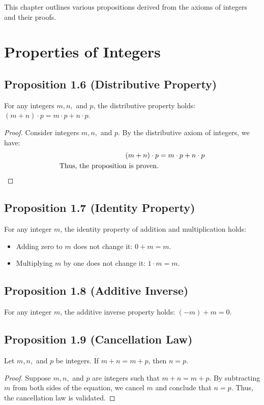 This chapter outlines various propositions derived from the axioms of integers and their proofs.

\section*{Properties of Integers}

\subsection*{Proposition 1.6 (Distributive Property)}
For any integers \(m, n,\) and \(p\), the distributive property holds: \((m + n) \cdot p = m \cdot p + n \cdot p\).

\begin{proof}
Consider integers \(m, n,\) and \(p\). By the distributive axiom of integers, we have:
\begin{align*}
    (m + n) \cdot p &= m \cdot p + n \cdot p \\
    \text{Thus, the proposition is proven.} \qedhere
\end{align*}
\end{proof}


\subsection*{Proposition 1.7 (Identity Property)}
For any integer \(m\), the identity property of addition and multiplication holds: 
\begin{itemize}
    \item Adding zero to \(m\) does not change it: \(0 + m = m\).
    \item Multiplying \(m\) by one does not change it: \(1 \cdot m = m\).
\end{itemize}

\subsection*{Proposition 1.8 (Additive Inverse)}
For any integer \(m\), the additive inverse property holds: \((-m) + m = 0\).

\subsection*{Proposition 1.9 (Cancellation Law)}
Let \(m, n,\) and \(p\) be integers. If \(m + n = m + p\), then \(n = p\).

\begin{proof}
Suppose \(m, n,\) and \(p\) are integers such that \(m + n = m + p\). By subtracting \(m\) from both sides of the equation, we cancel \(m\) and conclude that \(n = p\). Thus, the cancellation law is validated.
\end{proof}

